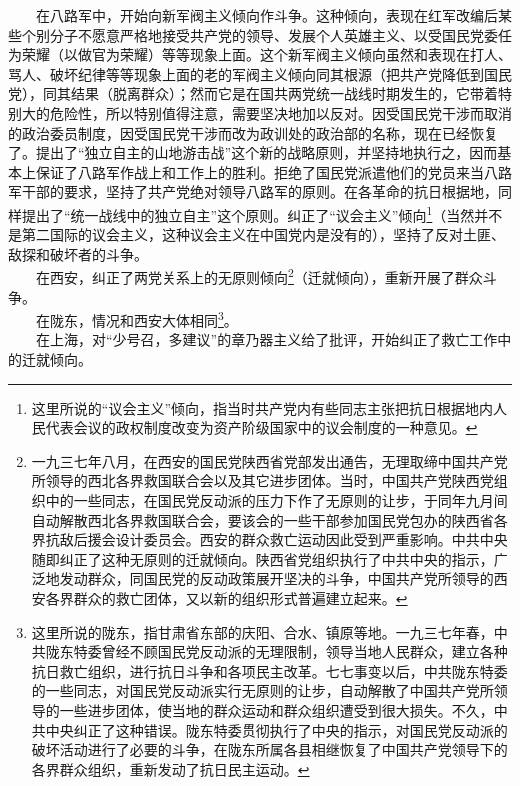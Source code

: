 \documentclass[cn,11pt,chinese]{elegantbook}
\begin{document}
　　在八路军中，开始向新军阀主义倾向作斗争。这种倾向，表现在红军改编后某些个别分子不愿意严格地接受共产党的领导、发展个人英雄主义、以受国民党委任为荣耀（以做官为荣耀）等等现象上面。这个新军阀主义倾向虽然和表现在打人、骂人、破坏纪律等等现象上面的老的军阀主义倾向同其根源（把共产党降低到国民党），同其结果（脱离群众）；然而它是在国共两党统一战线时期发生的，它带着特别大的危险性，所以特别值得注意，需要坚决地加以反对。因受国民党干涉而取消的政治委员制度，因受国民党干涉而改为政训处的政治部的名称，现在已经恢复了。提出了“独立自主的山地游击战”这个新的战略原则，并坚持地执行之，因而基本上保证了八路军作战上和工作上的胜利。拒绝了国民党派遣他们的党员来当八路军干部的要求，坚持了共产党绝对领导八路军的原则。在各革命的抗日根据地，同样提出了“统一战线中的独立自主”这个原则。纠正了“议会主义”倾向\footnote[10]{ 这里所说的“议会主义”倾向，指当时共产党内有些同志主张把抗日根据地内人民代表会议的政权制度改变为资产阶级国家中的议会制度的一种意见。}（当然并不是第二国际的议会主义，这种议会主义在中国党内是没有的），坚持了反对土匪、敌探和破坏者的斗争。\\
　　在西安，纠正了两党关系上的无原则倾向\footnote[11]{ 一九三七年八月，在西安的国民党陕西省党部发出通告，无理取缔中国共产党所领导的西北各界救国联合会以及其它进步团体。当时，中国共产党陕西党组织中的一些同志，在国民党反动派的压力下作了无原则的让步，于同年九月间自动解散西北各界救国联合会，要该会的一些干部参加国民党包办的陕西省各界抗敌后援会设计委员会。西安的群众救亡运动因此受到严重影响。中共中央随即纠正了这种无原则的迁就倾向。陕西省党组织执行了中共中央的指示，广泛地发动群众，同国民党的反动政策展开坚决的斗争，中国共产党所领导的西安各界群众的救亡团体，又以新的组织形式普遍建立起来。}（迁就倾向），重新开展了群众斗争。\\
　　在陇东，情况和西安大体相同\footnote[12]{ 这里所说的陇东，指甘肃省东部的庆阳、合水、镇原等地。一九三七年春，中共陇东特委曾经不顾国民党反动派的无理限制，领导当地人民群众，建立各种抗日救亡组织，进行抗日斗争和各项民主改革。七七事变以后，中共陇东特委的一些同志，对国民党反动派实行无原则的让步，自动解散了中国共产党所领导的一些进步团体，使当地的群众运动和群众组织遭受到很大损失。不久，中共中央纠正了这种错误。陇东特委贯彻执行了中央的指示，对国民党反动派的破坏活动进行了必要的斗争，在陇东所属各县相继恢复了中国共产党领导下的各界群众组织，重新发动了抗日民主运动。}。\\
　　在上海，对“少号召，多建议”的章乃器主义给了批评，开始纠正了救亡工作中的迁就倾向。\\
\end{document}
